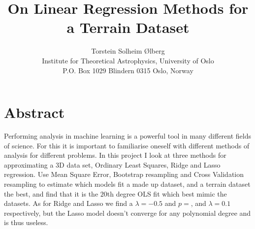 \documentclass[11pt, A4paper, english]{article}
\author{
Torstein Solheim Ølberg \\
Institute for Theoretical Astrophysics, University of Oslo \\
P.O. Box 1029 Blindern 0315 Oslo, Norway
}
\title{On Linear Regression Methods for a Terrain Dataset}
\begin{document}
	
\maketitle
\tableofcontents
\clearpage
	
	\section{Abstract}
Performing analysis in machine learning is a powerful tool in many different fields of science. For this it is important to familiarise oneself with different methods of analysis for different problems. In this project I look at three methods for approximating a 3D data set, Ordinary Least Squares, Ridge and Lasso regression. Use Mean Square Error, Bootstrap resampling and Cross Validation resampling to estimate which models fit a made up dataset, and a terrain dataset the best, and find that it is the $20$th degree OLS fit which best mimic the datasets. As for Ridge and Lasso we find a $\lambda = -0.5$ and $p = $, and $\lambda = 0.1$ respectively, but the Lasso model doesn't converge for any polynomial degree and is thus useless.
	
\end{document}
